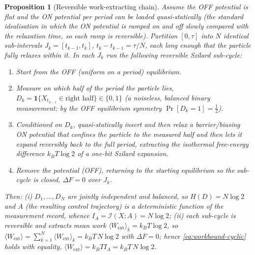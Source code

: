 \documentclass{amsart}
\newtheorem{proposition}{Proposition}
\theoremstyle{definition}
\newcommand{\kB}{k_{B}}
\newcommand{\Wext}{\langle W_{\mathrm{ext}}\rangle}
\begin{document}
\begin{proposition}[Reversible work-extracting chain]\label{prop:construct}
Assume the OFF potential is flat and the ON potential per period can be loaded
quasi-statically (the standard idealisation in which the ON potential is ramped
on and off slowly compared with the relaxation time, so each ramp is
reversible). Partition $[0,\tau]$ into $N$ identical sub-intervals
$J_k=[t_{k-1},t_k]$, $t_k-t_{k-1}=\tau/N$, each long enough that the particle
fully relaxes within it. In each $J_k$ run the following reversible Szilard
sub-cycle:
\begin{enumerate}
\item[\textup{(1)}] Start from the OFF (uniform on a period) equilibrium.
\item[\textup{(2)}] Measure on which half of the period the particle lies,
$D_k=\mathbf 1\{X_{t_{k-1}}\in \text{right half}\}\in\{0,1\}$ (a noiseless,
balanced binary measurement: by the OFF equilibrium symmetry
$\Pr[D_k=1]=\tfrac12$).
\item[\textup{(3)}] Conditioned on $D_k$, quasi-statically insert and then
relax a barrier/biasing ON potential that confines the particle to the
measured half and then lets it expand reversibly back to the full period,
extracting the isothermal free-energy difference $\kB T\log2$ of a one-bit
Szilard expansion.
\item[\textup{(4)}] Remove the potential (OFF), returning to the starting
equilibrium so the sub-cycle is closed, $\Delta F=0$ over $J_k$.
\end{enumerate}
Then:
\textup{(i)} $D_1,\dots,D_N$ are jointly independent and balanced, so
$H(D)=N\log2$ and $A$ (the resulting control trajectory) is a deterministic
function of the measurement record, whence $I_A=\mathcal I(X;A)=N\log2$;
\textup{(ii)} each sub-cycle is reversible and extracts mean work
$\langle W_{\mathrm{ext}}\rangle_k=\kB T\log2$, so
$\Wext=\sum_{k=1}^N\langle W_{\mathrm{ext}}\rangle_k=\kB T\,N\log2$ with
$\Delta F=0$; hence \eqref{eq:workbound-cyclic} holds with \emph{equality},
$\Wext=\kB T I_A=\kB T\,N\log2$.
\end{proposition}
\end{document}
